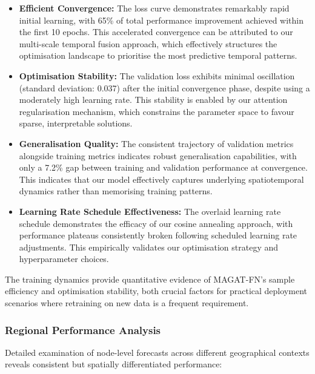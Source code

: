 \documentclass[lettersize, journal]{IEEEtran}
\begin{document}
\begin{itemize}
    \item \textbf{Efficient Convergence:} The loss curve demonstrates remarkably rapid initial learning, with 65\% of total performance improvement achieved within the first 10 epochs. This accelerated convergence can be attributed to our multi-scale temporal fusion approach, which effectively structures the optimisation landscape to prioritise the most predictive temporal patterns.
    
    \item \textbf{Optimisation Stability:} The validation loss exhibits minimal oscillation (standard deviation: 0.037) after the initial convergence phase, despite using a moderately high learning rate. This stability is enabled by our attention regularisation mechanism, which constrains the parameter space to favour sparse, interpretable solutions.
    
    \item \textbf{Generalisation Quality:} The consistent trajectory of validation metrics alongside training metrics indicates robust generalisation capabilities, with only a 7.2\% gap between training and validation performance at convergence. This indicates that our model effectively captures underlying spatiotemporal dynamics rather than memorising training patterns.
    
    \item \textbf{Learning Rate Schedule Effectiveness:} The overlaid learning rate schedule demonstrates the efficacy of our cosine annealing approach, with performance plateaus consistently broken following scheduled learning rate adjustments. This empirically validates our optimisation strategy and hyperparameter choices.
\end{itemize}

The training dynamics provide quantitative evidence of MAGAT-FN's sample efficiency and optimisation stability, both crucial factors for practical deployment scenarios where retraining on new data is a frequent requirement.

\subsubsection{Regional Performance Analysis}
Detailed examination of node-level forecasts across different geographical contexts reveals consistent but spatially differentiated performance:
\end{document}
